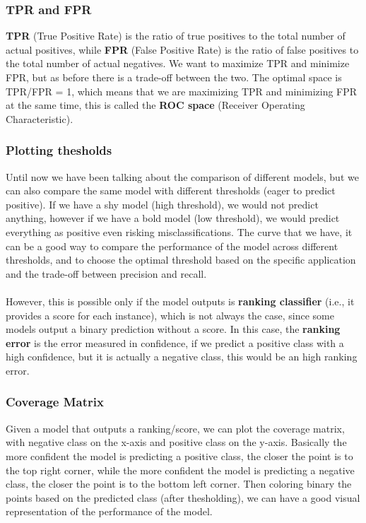 \subsubsection{TPR and FPR}
\textbf{TPR} (True Positive Rate) is the ratio of true positives to the total number of actual positives, while \textbf{FPR} (False Positive Rate) is the ratio of false positives to the total number of actual negatives.
We want to maximize TPR and minimize FPR, but as before there is a trade-off between the two.
The optimal space is TPR/FPR = 1, which means that we are maximizing TPR and minimizing FPR at the same time, this is called the \textbf{ROC space} (Receiver Operating Characteristic).

\subsubsection{Plotting thesholds}
Until now we have been talking about the comparison of different models, but we can also compare the same model with different thresholds (eager to predict positive).
If we have a shy model (high threshold), we would not predict anything, however if we have a bold model (low threshold), we would predict everything as positive even risking misclassifications.
The curve that we have, it can be a good way to compare the performance of the model across different thresholds, and to choose the optimal threshold based on the specific application and the trade-off between precision and recall.
\\\\
However, this is possible only if the model outputs is \textbf{ranking classifier} (i.e., it provides a score for each instance), which is not always the case, since some models output a binary prediction without a score.
In this case, the \textbf{ranking error} is the error measured in confidence, if we predict a positive class with a high confidence, but it is actually a negative class, this would be an high ranking error.

\subsubsection{Coverage Matrix}
Given a model that outputs a ranking/score, we can plot the coverage matrix, with negative class on the x-axis and positive class on the y-axis.
Basically the more confident the model is predicting a positive class, the closer the point is to the top right corner, while the more confident the model is predicting a negative class, the closer the point is to the bottom left corner.
Then coloring binary the points based on the predicted class (after thesholding), we can have a good visual representation of the performance of the model.

